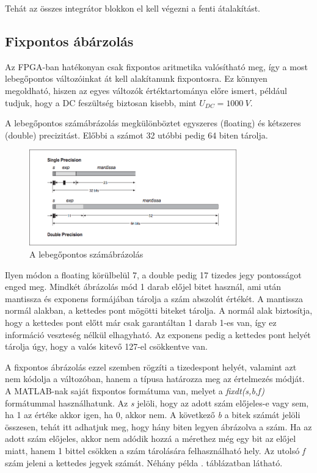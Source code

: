 Tehát az összes integrátor blokkon el kell végezni a fenti átalakítást.


\subsection{Fixpontos ábárzolás}

Az FPGA-ban hatékonyan csak fixpontos aritmetika valósítható meg, így a most lebegőpontos változóinkat át kell alakítanunk fixpontosra. Ez könnyen megoldható, hiszen az egyes változók értéktartománya előre ismert, például tudjuk, hogy a DC feszültség biztosan kisebb, mint $U_{DC}=1000\ V$.

A lebegőpontos számábrázolás megkülönböztet egyszeres (floating) és kétszeres (double) precizitást. Előbbi a számot 32 utóbbi pedig 64 biten tárolja.

\begin{figure}[H]
	\centering
	\includegraphics[width = 0.8\textwidth]{figures/floating.png}
	\caption{A lebegőpontos számábrázolás} 
	\label{fig:floating}
\end{figure}

Ilyen módon a floating körülbelül 7, a double pedig 17 tizedes jegy pontosságot enged meg. Mindkét ábrázolás mód 1 darab előjel bitet használ, ami után mantissza és exponens formájában tárolja a szám abszolút értékét. A mantissza normál alakban, a kettedes pont mögötti biteket tárolja. A normál alak biztosítja, hogy a kettedes pont előtt már csak garantáltan 1 darab 1-es van, így ez információ veszteség nélkül elhagyható. Az exponens pedig a kettedes pont helyét tárolja úgy, hogy a valós kitevő 127-el csökkentve van.

A fixpontos ábrázolás ezzel szemben rögzíti a tizedespont helyét, valamint azt nem kódolja a változóban, hanem a típusa határozza meg az értelmezés módját. A MATLAB-nak saját fixpontos formátuma van, melyet a \emph{fixdt(s,b,f)} formátummal használhatunk. Az \emph{s} jelöli, hogy az adott szám előjeles-e vagy sem, ha 1 az értéke akkor igen, ha 0, akkor nem. A következő \emph{b} a bitek számát jelöli összesen, tehát itt adhatjuk meg, hogy hány biten legyen ábrázolva a szám. Ha az adott szám előjeles, akkor nem adódik hozzá a mérethez még egy bit az előjel miatt, hanem 1 bittel csökken a szám tárolására felhasználható hely. Az utolsó \emph{f} szám jeleni a kettedes jegyek számát. Néhány példa . táblázatban látható.

